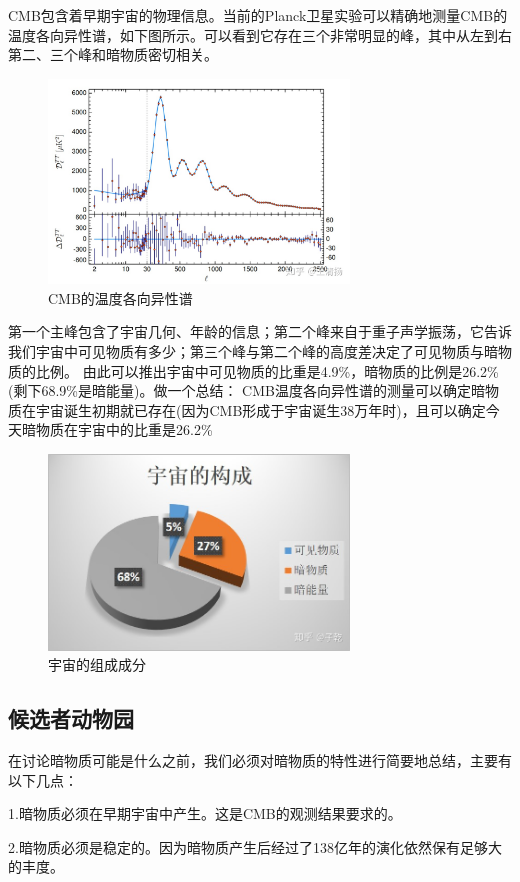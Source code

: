\documentclass[UTF8]{ctexart}
\begin{document}
CMB包含着早期宇宙的物理信息。当前的Planck卫星实验可以精确地测量CMB的温度各向异性谱，如下图所示。可以看到它存在三个非常明显的峰，其中从左到右第二、三个峰和暗物质密切相关。
\begin{figure}[H]
    \centering
    \includegraphics[width=8cm]{v2-fb241b2c22ab2142b5acb5c980928200.jpg}
    \caption{CMB的温度各向异性谱}
    \label{fig:my_label}
\end{figure}
第一个主峰包含了宇宙几何、年龄的信息；第二个峰来自于重子声学振荡，它告诉我们宇宙中可见物质有多少；第三个峰与第二个峰的高度差决定了可见物质与暗物质的比例。
由此可以推出宇宙中可见物质的比重是4.9\%，暗物质的比例是26.2\%(剩下68.9\%是暗能量)。做一个总结：
CMB温度各向异性谱的测量可以确定暗物质在宇宙诞生初期就已存在(因为CMB形成于宇宙诞生38万年时)，且可以确定今天暗物质在宇宙中的比重是26.2\%
\begin{figure}[H]
    \centering
    \includegraphics[width=8cm]{v2-cb275465102b39d2d2821a162e56b829.jpg}
    \caption{宇宙的组成成分}
    \label{fig:my_label}
\end{figure}
\subsection{候选者动物园}

在讨论暗物质可能是什么之前，我们必须对暗物质的特性进行简要地总结，主要有以下几点：


1.暗物质必须在早期宇宙中产生。这是CMB的观测结果要求的。

2.暗物质必须是稳定的。因为暗物质产生后经过了138亿年的演化依然保有足够大的丰度。
\end{document}
